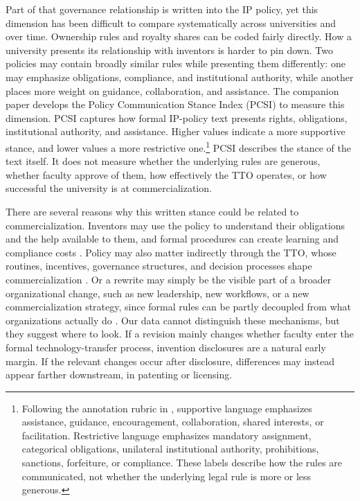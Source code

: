 Part of that governance relationship is written into the IP policy, yet this dimension has been difficult to compare systematically across universities and over time. Ownership rules and royalty shares can be coded fairly directly. How a university presents its relationship with inventors is harder to pin down. Two policies may contain broadly similar rules while presenting them differently: one may emphasize obligations, compliance, and institutional authority, while another places more weight on guidance, collaboration, and assistance. The companion paper \citep{SharmaPCSI2026} develops the Policy Communication Stance Index (PCSI) to measure this dimension. PCSI captures how formal IP-policy text presents rights, obligations, institutional authority, and assistance. Higher values indicate a more supportive stance, and lower values a more restrictive one.\footnote{Following the annotation rubric in \citet{SharmaPCSI2026}, supportive language emphasizes assistance, guidance, encouragement, collaboration, shared interests, or facilitation. Restrictive language emphasizes mandatory assignment, categorical obligations, unilateral institutional authority, prohibitions, sanctions, forfeiture, or compliance. These labels describe how the rules are communicated, not whether the underlying legal rule is more or less generous.} PCSI describes the stance of the text itself. It does not measure whether the underlying rules are generous, whether faculty approve of them, how effectively the TTO operates, or how successful the university is at commercialization.

There are several reasons why this written stance could be related to commercialization. Inventors may use the policy to understand their obligations and the help available to them, and formal procedures can create learning and compliance costs \citep{MoynihanHerdHarvey2015}. Policy may also matter indirectly through the TTO, whose routines, incentives, governance structures, and decision processes shape commercialization \citep{JensenThursbyThursby2003,SiegelWaldmanLink2003,DebackereVeugelers2005,MarkmanEtAl2005}. Or a rewrite may simply be the visible part of a broader organizational change, such as new leadership, new workflows, or a new commercialization strategy, since formal rules can be partly decoupled from what organizations actually do \citep{MeyerRowan1977}. Our data cannot distinguish these mechanisms, but they suggest where to look. If a revision mainly changes whether faculty enter the formal technology-transfer process, invention disclosures are a natural early margin. If the relevant changes occur after disclosure, differences may instead appear farther downstream, in patenting or licensing.

